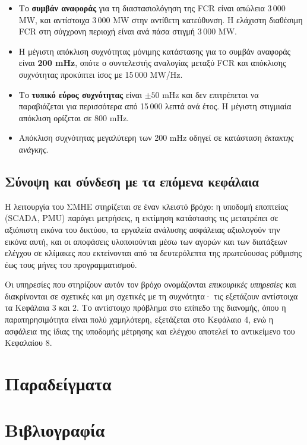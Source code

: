 \begin{itemize}
\item Το \textbf{συμβάν αναφοράς} για τη διαστασιολόγηση της FCR είναι απώλεια 3\,000 MW, και
      αντίστοιχα 3\,000 MW στην αντίθετη κατεύθυνση. Η ελάχιστη διαθέσιμη FCR στη σύγχρονη περιοχή
      είναι ανά πάσα στιγμή 3\,000 MW.
\item Η μέγιστη απόκλιση συχνότητας μόνιμης κατάστασης για το συμβάν αναφοράς είναι
      \textbf{200 mHz}, οπότε ο συντελεστής αναλογίας μεταξύ FCR και απόκλισης συχνότητας
      προκύπτει ίσος με 15\,000 MW/Hz.
\item Το \textbf{τυπικό εύρος συχνότητας} είναι $\pm 50$ mHz και δεν επιτρέπεται να παραβιάζεται
      για περισσότερα από 15\,000 λεπτά ανά έτος. Η μέγιστη στιγμιαία απόκλιση ορίζεται σε
      800 mHz.
\item Απόκλιση συχνότητας μεγαλύτερη των 200 mHz οδηγεί σε κατάσταση \emph{έκτακτης ανάγκης}.
\end{itemize}

\subsection{Σύνοψη και σύνδεση με τα επόμενα κεφάλαια}

Η λειτουργία του ΣΜΗΕ στηρίζεται σε έναν κλειστό βρόχο: η υποδομή εποπτείας (SCADA, PMU) παράγει
μετρήσεις, η εκτίμηση κατάστασης τις μετατρέπει σε αξιόπιστη εικόνα του δικτύου, τα εργαλεία
ανάλυσης ασφάλειας αξιολογούν την εικόνα αυτή, και οι αποφάσεις υλοποιούνται μέσω των αγορών και
των διατάξεων ελέγχου σε κλίμακες που εκτείνονται από τα δευτερόλεπτα της πρωτεύουσας ρύθμισης έως
τους μήνες του προγραμματισμού.

Οι υπηρεσίες που στηρίζουν αυτόν τον βρόχο ονομάζονται \emph{επικουρικές υπηρεσίες} και
διακρίνονται σε σχετικές και μη σχετικές με τη συχνότητα· τις εξετάζουν αντίστοιχα τα Κεφάλαια 3
και 2. Το αντίστοιχο πρόβλημα στο επίπεδο της διανομής, όπου η παρατηρησιμότητα είναι πολύ
χαμηλότερη, εξετάζεται στο Κεφάλαιο 4, ενώ η ασφάλεια της ίδιας της υποδομής μέτρησης και ελέγχου
αποτελεί το αντικείμενο του Κεφαλαίου 8.

\section{Παραδείγματα}
\label{kef-01-paradeigmata}

\section{Βιβλιογραφία}
\label{kef-01-vivliografia}

